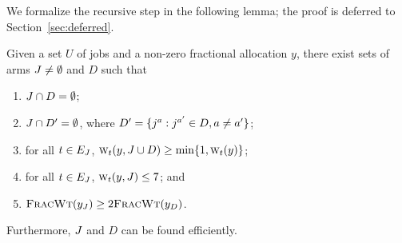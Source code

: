 We formalize the recursive step in the following lemma; the proof
is deferred to Section~\ref{sec:deferred}.
\begin{lemma}
    \label{lem:peeling}
    Given a set $U$ of jobs and a non-zero fractional allocation $y$,
    there exist sets of arms $J \ne \emptyset$ and $D$ such that 
    \begin{enumerate}[label=\roman*.]
        \item $J \cap D = \emptyset$;
        \item $J \cap D' = \emptyset$, where $D' = \{{{j}^a} : j^{a'}
            \in D, a\ne a'\}$;
        \item for all $t \in E_J$, $\textsc{w}_{t}(y, J \cup D)\ge
          \min\{1, \textsc{w}_{t}(y)\}$; \label{item:lowerbound}
        \item for all $t \in E_J$, $\textsc{w}_{t}(y, J) \le 7$; and
            \label{item:upperbound}
        \item ${\normalfont\textsc{FracWt}}(y_J) \ge 2 {\normalfont\textsc{FracWt}}(y_D)$. \label{item:wtbound}
    \end{enumerate}
    Furthermore, $J$ and $D$ can be found efficiently.
\end{lemma}


